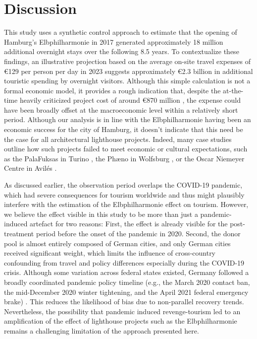 \documentclass[a4paper, 12pt]{article}
\begin{document}
\section{Discussion}

This study uses a synthetic control approach to estimate that the opening of Hamburg's Elbphilharmonie in 2017 generated approximately 18 million additional overnight stays over the following 8.5 years. To contextualize these findings, an illustrative projection based on the average on-site travel expenses of \euro{}129 per person per day in 2023 \citep{hamburgtourismus2024} suggests approximately \euro{}2.3 billion in additional touristic spending by overnight visitors. Although this simple calculation is not a formal economic model, it provides a rough indication that, despite the at-the-time heavily criticized project cost of around \euro{}870 million \citep{maak2015}, the expense could have been broadly offset at the macroeconomic level within a relatively short period. Although our analysis is in line with the Elbphilharmonie having been an economic success for the city of Hamburg, it doesn't indicate that this need be the case for all architectural lighthouse projects. Indeed, many case studies outline how such projects failed to meet economic or cultural expectations, such as the PalaFuksas in Turino \citep{vanolo2022}, the Ph{\ae}no in Wolfsburg \citep{alaily-mattar2019}, or the Oscar Niemeyer Centre in Avilés \citep{somozamedina2019}.

As discussed earlier, the observation period overlaps the COVID-19 pandemic, which had severe consequences for tourism worldwide and thus might plausibly interfere with the estimation of the Elbphilharmonie effect on tourism. However, we believe the effect visible in this study to be more than just a pandemic-induced artefact for two reasons: First, the effect is already visible for the post-treatment period before the onset of the pandemic in 2020. Second, the donor pool is almost entirely composed of German cities, and only German cities received significant weight, which limits the influence of cross-country confounding from travel and policy differences especially during the COVID-19 crisis. Although some variation across federal states existed, Germany followed a broadly coordinated pandemic policy timeline (e.g., the March 2020 contact ban, the mid-December 2020 winter tightening, and the April 2021 federal emergency brake) \citep{bonisch2020, schuppert2021}. This reduces the likelihood of bias due to non-parallel recovery trends. Nevertheless, the possibility that pandemic induced revenge-tourism led to an amplification of the effect of lighthouse projects such as the Elbphilharmonie remains a challenging limitation of the approach presented here.
\end{document}
